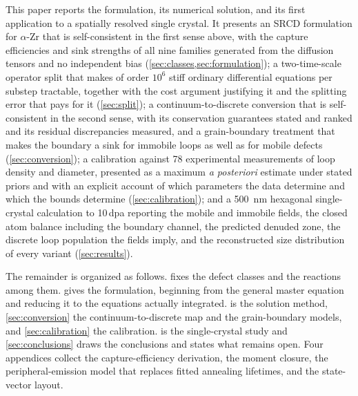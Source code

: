 This paper reports the formulation, its numerical solution, and its first
application to a spatially resolved single crystal. It presents an SRCD
formulation for $\alpha$-Zr that is self-consistent in the first sense above,
with the capture efficiencies and sink strengths of all nine families generated
from the diffusion tensors and no independent bias
(\cref{sec:classes,sec:formulation}); a two-time-scale operator split that makes
of order $10^{6}$ stiff ordinary differential equations per substep tractable,
together with the cost argument justifying it and the splitting error that pays
for it (\cref{sec:split}); a continuum-to-discrete conversion that is
self-consistent in the second sense, with its conservation guarantees stated and
ranked and its residual discrepancies measured, and a grain-boundary treatment
that makes the boundary a sink for immobile loops as well as for mobile defects
(\cref{sec:conversion}); a calibration against 78 experimental measurements of
loop density and diameter, presented as a maximum \emph{a posteriori} estimate
under stated priors and with an explicit account of which parameters the data
determine and which the bounds determine (\cref{sec:calibration}); and a
\SI{500}{\nano\meter} hexagonal single-crystal calculation to 10\,dpa reporting
the mobile and immobile fields, the closed atom balance including the boundary
channel, the predicted denuded zone, the discrete loop population the fields
imply, and the reconstructed size distribution of every variant
(\cref{sec:results}).

The remainder is organized as follows.  fixes the defect
classes and the reactions among them.  gives the
formulation, beginning from the general master equation and reducing it to the
equations actually integrated.  is the solution method,
\cref{sec:conversion} the continuum-to-discrete map and the grain-boundary
models, and \cref{sec:calibration} the calibration.  is the
single-crystal study and \cref{sec:conclusions} draws the conclusions and states
what remains open. Four appendices collect the capture-efficiency derivation,
the moment closure, the peripheral-emission model that replaces fitted annealing
lifetimes, and the state-vector layout.
